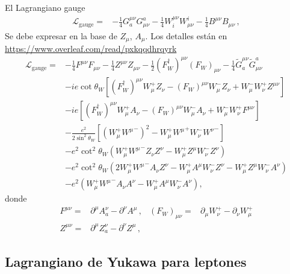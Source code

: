 \begin{frame}
El Lagrangiano gauge
\begin{align}
  \mathcal{L}_{\text{gauge}}=& -\tfrac{1}{4}G^{\mu\nu}_a G_{\mu\nu}^a-\tfrac{1}{4}W^{\mu\nu}_i W_{\mu\nu}^i-\tfrac{1}{4}B^{\mu\nu} B_{\mu\nu}\,,
\end{align}
Se debe expresar en la base de $Z_\mu$, $A_\mu$. Los detalles están en \url{https://www.overleaf.com/read/pxkqqdhrqyrk}
\begin{align}
\label{eq:lgaguefin}
\mathcal{L}_{\text{gauge}}=&  -\tfrac{1}{4}F^{\mu\nu} F_{\mu\nu}-\tfrac{1}{4}Z^{\mu\nu} Z_{\mu\nu}-\tfrac{1}{2}(F_W^\dagger)^{\mu\nu} (F_W)_{\mu\nu}
- \tfrac{1}{4}\widetilde{G}^{\mu\nu}_a \widetilde{G}_{\mu\nu}^a\nonumber\\
&-ie\cot\theta_W\left[(F_W^\dagger)^{\mu\nu}W_\mu^+ Z_\nu-(F_W)^{\mu\nu}W_\mu^- Z_\nu+W_\mu^-W_\nu^+Z^{\mu\nu}\right]\nonumber\\
&-ie\left[(F_W^\dagger)^{\mu\nu}W_\mu^+ A_\nu-(F_W)^{\mu\nu}W_\mu^- A_\nu+W_\mu^-W_\nu^+F^{\mu\nu}\right]\nonumber\\
&-\frac{e^2}{2\sin^2\theta_W}\left[\left(W_\mu^+{W^\mu}^-\right)^2-W_\mu^+{W^\mu}^+W_\nu^-{W^\nu}^-\right] \nonumber\\
&-e^2\cot^2\theta_W\left(W_\mu^+{W^\mu}^-Z_\nu Z^\nu-W_\mu^+Z^\mu W_\nu^-Z^\nu\right)\nonumber\\
&-e^2\cot^2\theta_W\left(2W_\mu^+{W^\mu}^-A_\nu Z^\nu-W_\mu^+A^\mu W_\nu^-Z^\nu-W_\mu^+Z^\mu W_\nu^-A^\nu\right)\nonumber\\
&-e^2\left(W_\mu^+{W^\mu}^-A_\nu A^\nu-W_\mu^+A^\mu W_\nu^-A^\nu\right),
\end{align}
donde
\begin{align}
  {F}^{\mu\nu}=&\partial^\mu A^\nu_a-\partial^\nu A^\mu\,, &  (F_W)_{\mu\nu}=&\partial_\mu W^+_\nu-\partial_\nu W^+_\mu\nonumber\\
  {Z}^{\mu\nu}=&\partial^\mu Z^\nu_a-\partial^\nu Z^\mu\,,& &%
\end{align}

\end{frame}


\subsection{Lagrangiano  de Yukawa para leptones}

